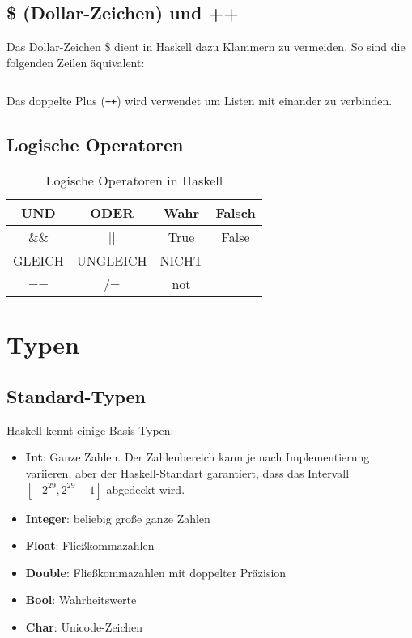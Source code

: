 \subsection{\$ (Dollar-Zeichen) und ++}%
Das Dollar-Zeichen \$ dient in Haskell dazu Klammern zu vermeiden. So sind die
folgenden Zeilen äquivalent:

\inputminted[numbersep=5pt, tabsize=4]{haskell}{scripts/haskell/dollar-example.hs}

Das doppelte Plus (\texttt{++}) wird verwendet um Listen mit einander zu verbinden.

\subsection{Logische Operatoren}
\begin{table}[h]
    \centering 
    \begin{tabular}{CCCC}
    UND    & ODER     & Wahr  & Falsch \\ \hline\hline
    \&\&   & ||       & True  & False \\[4ex]
    GLEICH & UNGLEICH & NICHT & ~     \\ \hline\hline
    ==     & /=       & not   & ~     \\ 
    \end{tabular}
    \caption{Logische Operatoren in Haskell}
\end{table}

\section{Typen}
\subsection{Standard-Typen}
Haskell kennt einige Basis-Typen:
\begin{itemize}
  \item \textbf{Int}: Ganze Zahlen. Der Zahlenbereich kann je nach Implementierung variieren,
  aber der Haskell-Standart garantiert, dass das Intervall 
  $[-2^{29}, 2^{29}-1]$ abgedeckt wird.
  \item \textbf{Integer}: beliebig große ganze Zahlen
  \item \textbf{Float}: Fließkommazahlen
  \item \textbf{Double}: Fließkommazahlen mit doppelter Präzision
  \item \textbf{Bool}: Wahrheitswerte
  \item \textbf{Char}: Unicode-Zeichen
\end{itemize}

